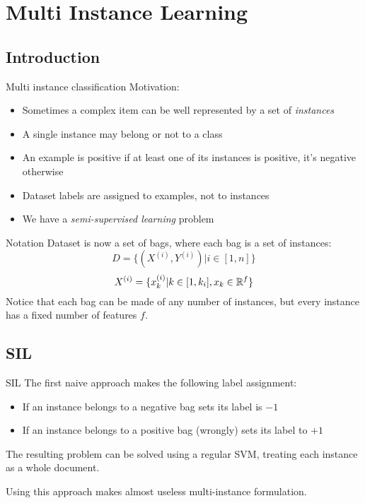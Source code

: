 \section{Multi Instance Learning}
 
\subsection{Introduction}
\begin{frame}{Multi instance classification}
	Motivation:
	\begin{itemize}\setlength\itemsep{1em}
		\item Sometimes a complex item can be well represented by a set of \textit{instances}
		\item A single instance may belong or not to a class
		\item An example is positive if at least one of its instances is positive, it's negative otherwise
		\item Dataset labels are assigned to examples, not to instances
		\item We have a \textit{semi-supervised learning} problem
	\end{itemize}
\end{frame}

\begin{frame}{Notation}
	Dataset is now a set of bags, where each bag is a set of instances:
	$$D = \{(X^{(i)}, Y^{(i)}) | i \in [1, n]\}$$
	$$X^{(i)} = \{x_k^{(i)} | k \in [1, k_i], x_k \in \mathbb{R}^f\}$$
	Notice that each bag can be made of any number of instances, but every instance has a fixed number of features $f$.
\end{frame}

\subsection{SIL}
\begin{frame}{SIL}
	The first naive approach makes the following label assignment:
	\begin{itemize}\setlength\itemsep{1em}
		\item If an instance belongs to a negative bag sets its label is $-1$
		\item If an instance belongs to a positive bag (wrongly) sets its label to $+1$
	\end{itemize}
	The resulting problem can be solved using a regular SVM, treating each instance as a whole document.
	
	Using this approach makes almost useless multi-instance formulation.
\end{frame}


